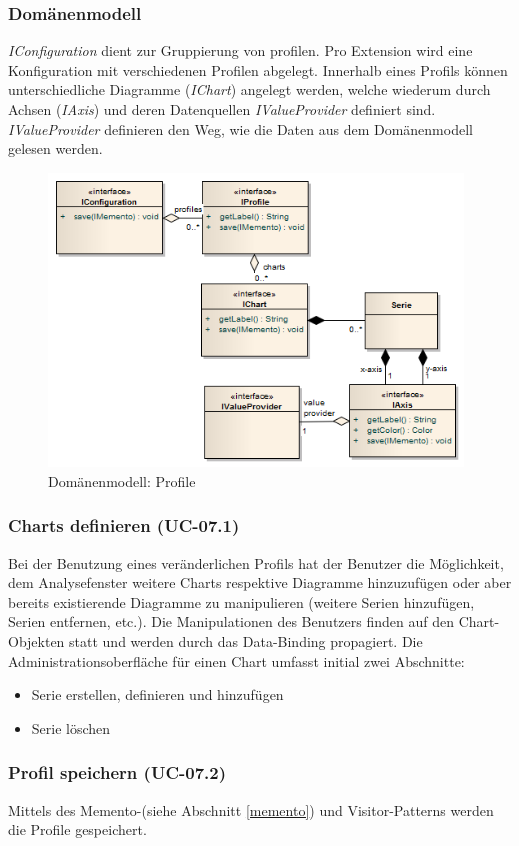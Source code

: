 \subsubsection{Domänenmodell}
\textit{IConfiguration} dient zur Gruppierung von profilen. Pro Extension wird eine Konfiguration mit verschiedenen Profilen abgelegt. Innerhalb eines Profils können unterschiedliche Diagramme (\textit{IChart}) angelegt werden, welche wiederum durch Achsen (\textit{IAxis}) und deren Datenquellen \textit{IValueProvider} definiert sind. \textit{IValueProvider} definieren den Weg, wie die Daten aus dem Domänenmodell gelesen werden.
 \begin{figure}[H]
  	\centering
    	\includegraphics[width=11cm]{images/core_domain_profiles}
        	\caption{Domänenmodell: Profile}
\end{figure}

\subsubsection{Charts definieren (UC-07.1)}
Bei der Benutzung eines veränderlichen Profils hat der Benutzer die Möglichkeit, dem Analysefenster weitere Charts respektive Diagramme hinzuzufügen oder aber bereits existierende Diagramme zu manipulieren (weitere Serien hinzufügen, Serien entfernen, etc.). Die Manipulationen des Benutzers finden auf den Chart-Objekten statt und werden durch das Data-Binding propagiert. Die Administrationsoberfläche für einen Chart umfasst initial zwei Abschnitte:
\begin{itemize}
	\item Serie erstellen, definieren und hinzufügen
	 \item Serie löschen
\end{itemize}

\subsubsection{Profil speichern (UC-07.2)}
Mittels des Memento-(siehe Abschnitt \ref{memento}) und Visitor-Patterns\cite[S. 331]{gamma1995design} werden die Profile gespeichert.

